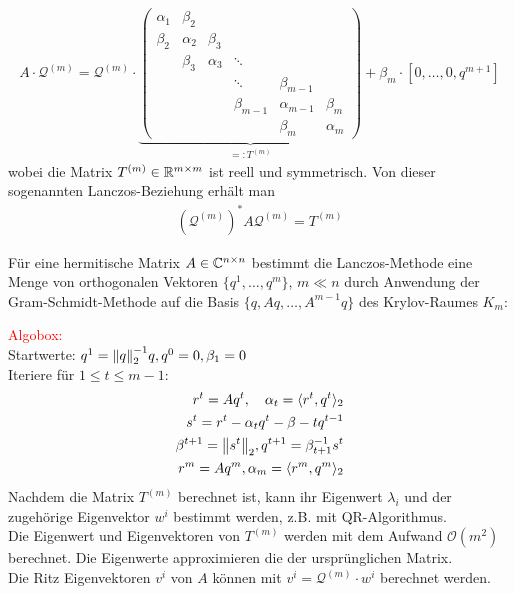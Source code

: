 \begin{align*}A\cdot \mathcal{Q}^{(m)} = \mathcal{Q}^{(m)}\cdot\underbrace{\begin{pmatrix}
  \alpha_1 & \beta_2 & & & & \\
  \beta_2 & \alpha_2 & \beta_3 & & & \\
  & \beta_3 & \alpha_3 & \ddots & & \\
  & & & \ddots & \beta_{m-1} & \\
  & & & \beta_{m-1} & \alpha_{m-1} & \beta_m \\
  & & & & \beta_m & \alpha_m
\end{pmatrix}}_{=:T^{(m)}} + \beta_m\cdot[0,\dots,0,q^{m+1}]\end{align*}
wobei die Matrix $T^{(m)}\in\mathbb R^{m\times m}$ ist reell und symmetrisch. Von dieser sogenannten Lanczos-Beziehung
erhält man 
\begin{align*}(\mathcal{Q}^{(m)})^* A \mathcal{Q}^{(m)} = T^{(m)}\end{align*} 
\begin{defbox}
  Für eine hermitische Matrix $A\in\mathbb C  ^{n\times n}$ bestimmt die Lanczos-Methode eine Menge von orthogonalen 
  Vektoren $\{q^1,\dots,q^m\}$, $m\ll n$ durch Anwendung der Gram-Schmidt-Methode auf die Basis 
  $\{q,Aq,\dotsc,A^{m-1}q\}$ des Krylov-Raumes $K_m$:
\end{defbox}
\textcolor{red}{Algobox:} \\
Startwerte: $q^1=\vertn{2}{q}_2^{-1}q, q^0=0, \beta_1=0$ \\
Iteriere für $1\leq t\leq m-1$:
\begin{align*}
  r^t = Aq^t, \quad \alpha_t = \langle r^t, q^t\rangle_2 \\
  s^t = r^t - \alpha_t q^t - \beta-tq^{t-1} \\
  \beta^{t+1} = \vertn{2}{s^t}_2, q^{t+1} = \beta_{t+1}^{-1}s^t \\
  r^m = Aq^m, \alpha_m = \langle r^m,q^m\rangle_2
\end{align*}
Nachdem die Matrix $T^{(m)}$ berechnet ist, kann ihr Eigenwert $\lambda_i$ und der zugehörige Eigenvektor $w^{i}$
bestimmt werden, z.B. mit QR-Algorithmus. \\
Die Eigenwert und Eigenvektoren von $T^{(m)}$ werden mit dem Aufwand $\mathcal{O}(m^2)$ berechnet. Die Eigenwerte 
approximieren die der ursprünglichen Matrix. \\
Die Ritz Eigenvektoren $v^i$ von $A$ können mit $v^i=\mathcal{Q}^{(m)}\cdot w^i$ berechnet werden.

